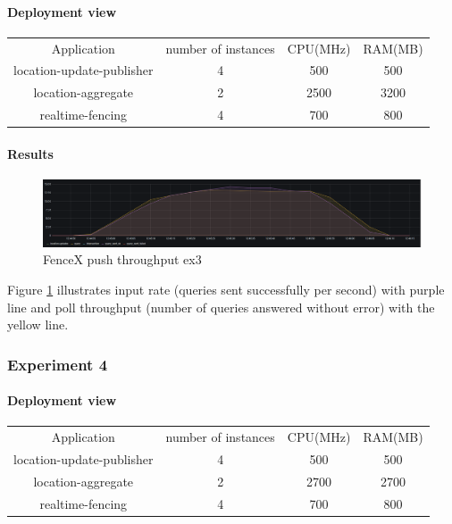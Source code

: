 \documentclass[a4]{report}
\begin{document}
        \paragraph{Deployment view}
        \begin{center}
            \begin{tabular}{ c c c c }
                Application               & number of instances & CPU(MHz) & RAM(MB) \\
                location-update-publisher & 4                   & 500      & 500     \\
                location-aggregate        & 2                   & 2500     & 3200    \\
                realtime-fencing          & 4                   & 700      & 800     \\
            \end{tabular}
        \end{center}

        \paragraph{Results}
        \begin{figure}[ht]
            \caption{FenceX push throughput ex3}
            \label{fig:ex3}
            \includegraphics[scale=0.4]{images/evaluation/ex3-benchmarking(16,9).png}
        \end{figure}

        Figure \ref{fig:ex3} illustrates input rate (queries sent successfully per second) with purple line and poll
        throughput (number of queries answered without error) with the yellow line.

        \clearpage

        \subsubsection{Experiment 4}

        \paragraph{Deployment view}
        \begin{center}
            \begin{tabular}{ c c c c }
                Application               & number of instances & CPU(MHz) & RAM(MB) \\
                location-update-publisher & 4                   & 500      & 500     \\
                location-aggregate        & 2                   & 2700     & 2700    \\
                realtime-fencing          & 4                   & 700      & 800     \\
            \end{tabular}
        \end{center}
\end{document}
